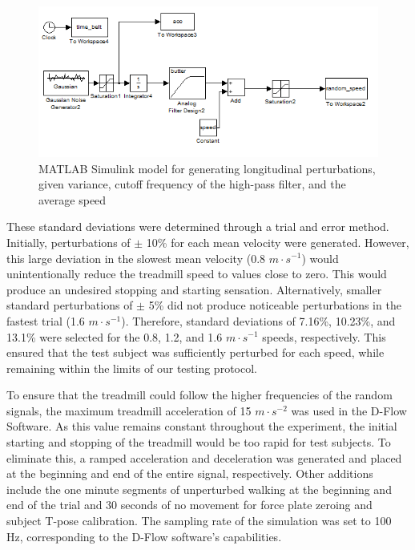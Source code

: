 \documentclass{article}
\begin{document}
\begin{figure}
  \includegraphics{figures/longitudinal_perturbation.PNG}
  \caption{MATLAB Simulink model for generating longitudinal perturbations,
                given variance, cutoff frequency of the high-pass filter, and
                the average speed}
  \label{fig:simulink}
\end{figure}

These standard deviations were determined through a trial and error method.
Initially, perturbations of $\pm$ 10\% for each mean velocity were generated.
However, this large deviation in the slowest mean velocity (0.8 $m \cdot
s^{-1}$) would unintentionally reduce the treadmill speed to values close to
zero. This would produce an undesired stopping and starting sensation.
Alternatively, smaller standard perturbations of $\pm$ 5\% did not produce
noticeable perturbations in the fastest trial (1.6 $m \cdot s^{-1}$).
Therefore, standard deviations of 7.16\%, 10.23\%, and 13.1\% were selected for
the 0.8, 1.2, and 1.6 $m \cdot s^{-1}$ speeds, respectively.  This ensured that
the test subject was sufficiently perturbed for each speed, while remaining
within the limits of our testing protocol.

To ensure that the treadmill could follow the higher frequencies of the random
signals, the maximum treadmill acceleration of 15 $m \cdot s^{-2}$ was used in
the D-Flow Software. As this value remains constant throughout the experiment,
the initial starting and stopping of the treadmill would be too rapid for test
subjects. To eliminate this, a ramped acceleration and deceleration was
generated and placed at the beginning and end of the entire signal,
respectively. Other additions include the one minute segments of unperturbed
walking at the beginning and end of the trial and 30 seconds of no movement for
force plate zeroing and subject T-pose calibration.  The sampling rate of the
simulation was set to 100 Hz, corresponding to the D-Flow software's
capabilities.
\end{document}
